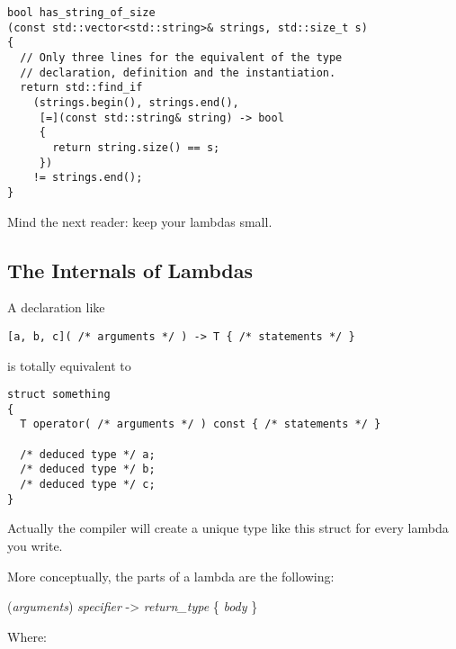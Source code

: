 \begin{lstlisting}
bool has_string_of_size
(const std::vector<std::string>& strings, std::size_t s)
{
  // Only three lines for the equivalent of the type
  // declaration, definition and the instantiation.
  return std::find_if
    (strings.begin(), strings.end(),
     [=](const std::string& string) -> bool
     {
       return string.size() == s;
     })
    != strings.end();
}
\end{lstlisting}

\begin{guideline}
  Mind the next reader: keep your lambdas small.
\end{guideline}

\subsection{The Internals of Lambdas}
\label{lambdas-internals}

A declaration like

\begin{lstlisting}
[a, b, c]( /* arguments */ ) -> T { /* statements */ }
\end{lstlisting}

is totally equivalent to

\begin{lstlisting}
struct something
{
  T operator( /* arguments */ ) const { /* statements */ }

  /* deduced type */ a;
  /* deduced type */ b;
  /* deduced type */ c;
}
\end{lstlisting}

Actually the compiler will create a unique type like this struct for
every lambda you write.

More conceptually, the parts of a lambda are the following:

\bigskip

\indent [{\it capture}]({\it arguments}) {\it specifier} -\textgreater
        {\it return\_type} \{ {\it body} \}

\bigskip

Where:

